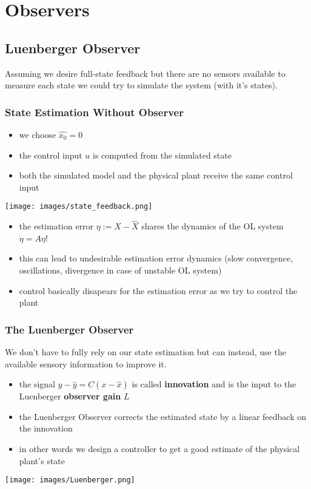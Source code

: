 \section{Observers}
\subsection{Luenberger Observer}
Assuming we desire full-state feedback but there are no sensors available to measure each state we could try to simulate the system (with it's states).
\subsubsection{State Estimation Without Observer}
\begin{itemize}
    \item we choose $\hat{x_0}=0$
    \item the control input $u$ is computed from the simulated state
    \item both the simulated model and the physical plant receive the same control input
\end{itemize}
\begin{center}
    \texttt{[image: images/state\_feedback.png]}\\
\end{center}

\begin{itemize}
    \item the estimation error $\eta:=X-\hat{X}$ shares the dynamics of the OL system $\dot{\eta}=A\eta$!
    \item this can lead to undesirable estimation error dynamics (slow convergence, oscillations, divergence in case of unstable OL system)
    \item control basically disapears for the estimation error as we try to control the plant
\end{itemize}

\subsubsection{The Luenberger Observer}
We don't have to fully rely on our state estimation but can instead, use the available sensory information to improve it.
\begin{itemize}
    \item the signal $y-\hat{y}=C(x-\hat{x})$ is called \textbf{innovation} and is the input to the Luenberger \textbf{observer gain} $L$
    \item the Luenberger Observer corrects the estimated state by a linear feedback on the innovation
    \item in other words we design a controller to get a good estimate of the physical plant's state
\end{itemize}
\begin{center}
    \texttt{[image: images/Luenberger.png]}
\end{center}

